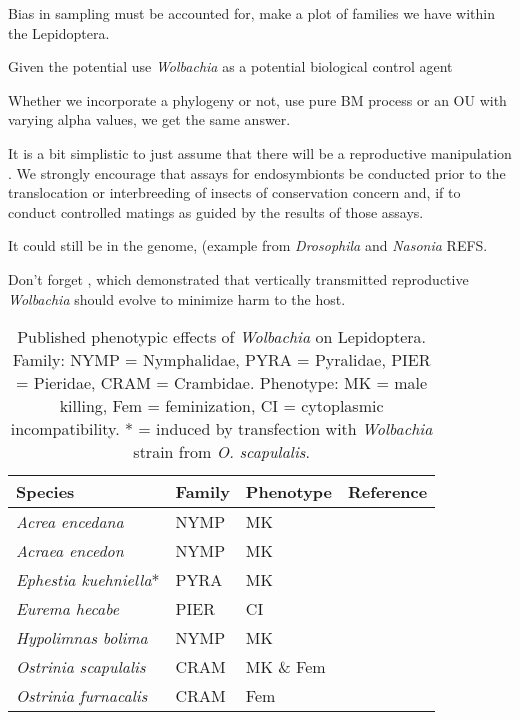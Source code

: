 \documentclass[12pt]{article}
\begin{document}
Bias in sampling must be accounted for, make a plot of families we have within the Lepidoptera.

Given the potential use \textit{Wolbachia} as a potential biological control agent

Whether we incorporate a phylogeny or not, use pure BM process or an OU with varying alpha values, we get the same answer. 

It is a bit simplistic to just assume that there will be a reproductive manipulation \citep{Nice:2009p7399,Hamm:2014wi}. We strongly encourage that assays for endosymbionts be conducted prior to the translocation or interbreeding of insects of conservation concern and, if to conduct controlled matings as guided by the results of those assays. 

It could still be in the genome, (example from \textit{Drosophila} and \textit{Nasonia} REFS.

Don’t forget \citet{Prout:1994th}, which demonstrated that vertically transmitted reproductive \textit{Wolbachia} should evolve to minimize harm to the host. 


\begin{table}
\begin{tabular}{l l l l}
\hline
Species & Family & Phenotype & Reference\\
\hline
\textit{Acrea encedana}& NYMP & MK & \citet{Jiggins:2000gz}\\
\textit{Acraea encedon} & NYMP & MK & \citet{Jiggins:1998p7753}\\
\textit{Ephestia kuehniella}* & PYRA & MK & \citet{Fujii:2001p8208}\\
\textit{Eurema hecabe} & PIER & CI & \citet{Narita:2007p8218}\\
\textit{Hypolimnas bolima} & NYMP & MK & \citet{Dyson:2002p8665,Mitsuhashi:2004p8229}\\
\textit{Ostrinia scapulalis} & CRAM & MK \& Fem & \citet{Sugimoto:2012ge}\\
\textit{Ostrinia furnacalis} & CRAM & Fem & \citet{Kageyama:2002p8664}\\
\hline
\end{tabular}
\caption{Published phenotypic effects of \textit{Wolbachia} on Lepidoptera. Family: NYMP = Nymphalidae, PYRA = Pyralidae, PIER = Pieridae, CRAM = Crambidae. Phenotype: MK = male killing, Fem = feminization, CI = cytoplasmic incompatibility. * = induced by transfection with \textit{Wolbachia} strain from \textit{O. scapulalis}.} 
\end{table}
\end{document}
